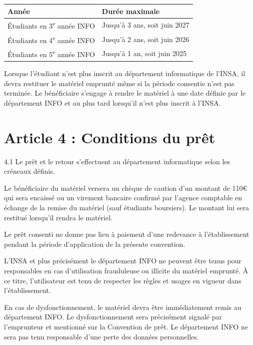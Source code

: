 \documentclass[12pt,a4paper]{article}
\begin{document}
\begin{center}
\begin{tabular}{|l|l|}
\hline
\textbf{Année} & \textbf{Durée maximale} \\
\hline
Étudiants en 3\textsuperscript{e} année INFO & Jusqu’à 3 ans, soit juin 2027 \\
Étudiants en 4\textsuperscript{e} année INFO & Jusqu’à 2 ans, soit juin 2026 \\
Étudiants en 5\textsuperscript{e} année INFO & Jusqu’à 1 an, soit juin 2025 \\
\hline
\end{tabular}
\end{center}

Lorsque l’étudiant n’est plus inscrit au département informatique de l’INSA, il devra restituer le matériel emprunté même si la période consentie n’est pas terminée.  
Le bénéficiaire s’engage à rendre le matériel à une date définie par le département INFO et au plus tard lorsqu’il n’est plus inscrit à l’INSA.

\section*{Article 4 : Conditions du prêt}

4.1 Le prêt et le retour s’effectuent au département informatique selon les créneaux définis.

 Le bénéficiaire du matériel versera un chèque de caution d’un montant de 110€ qui sera encaissé ou un virement bancaire confirmé par l’agence comptable en échange de la remise du matériel (sauf étudiants boursiers). Le montant lui sera restitué lorsqu’il rendra le matériel.

 Le prêt consenti ne donne pas lieu à paiement d’une redevance à l’établissement pendant la période d’application de la présente convention.

 L’INSA et plus précisément le département INFO ne peuvent être tenus pour responsables en cas d’utilisation frauduleuse ou illicite du matériel emprunté. À ce titre, l’utilisateur est tenu de respecter les règles et usages en vigueur dans l’établissement.

 En cas de dysfonctionnement, le matériel devra être immédiatement remis au département INFO.  
Le dysfonctionnement sera précisément signalé par l’emprunteur et mentionné sur la Convention de prêt.  
Le département INFO ne sera pas tenu responsable d’une perte des données personnelles.
\end{document}
